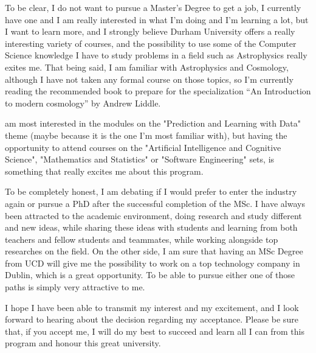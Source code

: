 \documentclass{article}
\begin{document}
To be clear, I do not want to pursue a Master's Degree to get a job, I currently have one and I am really interested in what I'm doing and I'm learning a lot, but I want to learn more, and I strongly believe Durham University offers a really interesting variety of courses, and the possibility to use some of the Computer Science knowledge I have to study problems in a field such as Astrophysics really exites me. That being said, I am familiar with Astrophysics and Cosmology, although I have not taken any formal course on those topics, so I'm currently reading the recommended book to prepare for the specialization ``An Introduction to modern cosmology'' by Andrew Liddle.

am most interested in the modules on the "Prediction and Learning with Data" theme (maybe because it is the one I'm most familiar with), but having the opportunity to attend courses on the "Artificial Intelligence and Cognitive Science", "Mathematics and Statistics" or "Software Engineering" sets, is something that really excites me about this program.

To be completely honest, I am debating if I would prefer to enter the industry again or pursue a PhD after the successful completion of the MSc. I have always been attracted to the academic environment, doing research and study different and new ideas, while sharing these ideas with students and learning from both teachers and fellow students and teammates, while working alongside top researches on the field. On the other side, I am sure that having an MSc Degree from UCD will give me the possibility to work on a top technology company in Dublin, which is a great opportunity. To be able to pursue either one of those paths is simply very attractive to me.

I hope I have been able to transmit my interest and my excitement, and I look forward to hearing about the decision regarding my acceptance. Please be sure that, if you accept me, I will do my best to succeed and learn all I can from this program and honour this great university.
\end{document}
